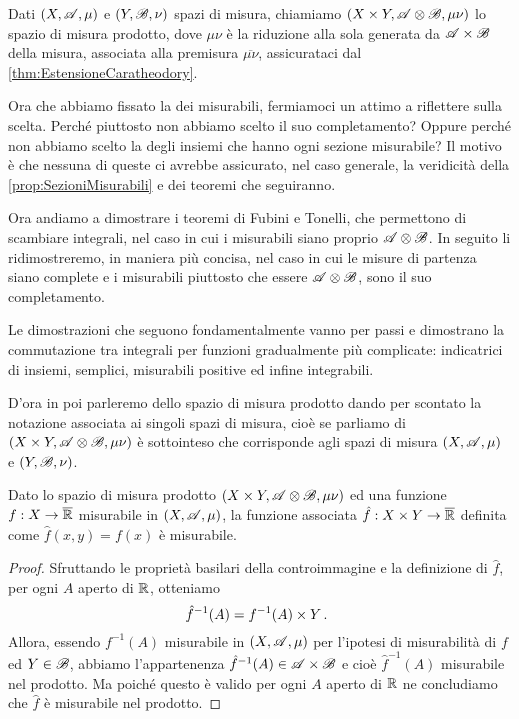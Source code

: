 \begin{definition}\label{def:MisuraProdotto}
	Dati $(X,\mathscr A,\mu)$ e $(Y,\mathscr B,\nu)$ spazi di misura, chiamiamo $(X\times Y,\mathscr A\otimes\mathscr B,\mu\nu)$ lo spazio di misura prodotto, dove $\mu\nu$ è la riduzione alla sola \sigalg{} generata da $\mathscr A\times\mathscr B$ della misura, associata alla premisura $\overline{\mu\nu}$, assicurataci dal \cref{thm:EstensioneCaratheodory}.
\end{definition}


Ora che abbiamo fissato la \sigalg{} dei misurabili, fermiamoci un attimo a riflettere sulla scelta. Perché piuttosto non abbiamo scelto il suo completamento? Oppure perché non abbiamo scelto la \sigalg{} degli insiemi che hanno ogni sezione misurabile? 
Il motivo è che nessuna di queste ci avrebbe assicurato, nel caso generale, la veridicità della \cref{prop:SezioniMisurabili} e dei teoremi che seguiranno.

Ora andiamo a dimostrare i teoremi di Fubini e Tonelli, che permettono di scambiare integrali, nel caso in cui i misurabili siano proprio $\mathscr A\otimes\mathscr B$. In seguito li ridimostreremo, in maniera più concisa, nel caso in cui le misure di partenza siano complete e i misurabili piuttosto che essere $\mathscr A\otimes\mathscr B$, sono il suo completamento.

Le dimostrazioni che seguono fondamentalmente vanno per passi e dimostrano la commutazione tra integrali per funzioni gradualmente più complicate: indicatrici di insiemi, semplici, misurabili positive ed infine integrabili.

D'ora in poi parleremo dello spazio di misura prodotto dando per scontato la notazione associata ai singoli spazi di misura, cioè se parliamo di $(X\times Y,\mathscr A\otimes\mathscr B,\mu\nu)$ è sottointeso che corrisponde agli spazi di misura $(X,\mathscr A,\mu)$ e $(Y,\mathscr B,\nu)$.

\begin{remark}\label{nota:FunzioniMisProdotto}
	Dato lo spazio di misura prodotto $(X\times Y,\mathscr A\otimes\mathscr B,\mu\nu)$ ed una funzione $f:X\to\overline{\mathbb R}$ misurabile in $(X,\mathscr A,\mu)$, la funzione associata $\hat f:X\times Y\to\overline{\mathbb R}$ definita come $\hat f(x,y)=f(x)$ è misurabile.
\end{remark}
\begin{proof}
	Sfruttando le proprietà basilari della controimmagine e la definizione di $\hat f$, per ogni $A$ aperto di $\mathbb R$, otteniamo
	\begin{equation*}
		\hat f^{-1}(A)=f^{-1}(A)\times Y \, \text{. }
	\end{equation*}
	Allora, essendo $f^{-1}(A)$ misurabile in $(X,\mathscr A,\mu)$ per l'ipotesi di misurabilità di $f$ ed $Y\in\mathscr B$, abbiamo l'appartenenza $\hat f^{-1}(A)\in \mathscr A\times\mathscr B$ e cioè $\hat f^{-1}(A)$ misurabile nel prodotto.
	Ma poiché questo è valido per ogni $A$ aperto di $\mathbb R$ ne concludiamo che $\hat f$ è misurabile nel prodotto.
\end{proof}


